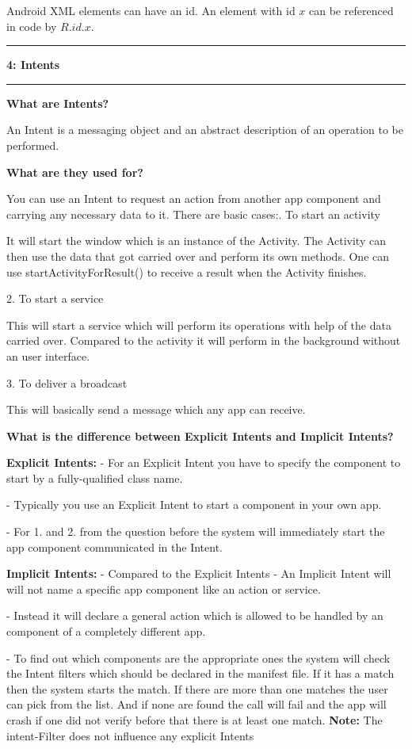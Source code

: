 \documentclass[11pt]{article}
\newcommand\question[2]{\vspace{.25in}\hrule\textbf{#1: #2}\vspace{.5em}\hrule\vspace{.10in}}
\begin{document}
Android XML elements can have an id. An element with id $x$ can be referenced in code by $R.id.x$.

\question{4}{Intents} 

\textbf {What are Intents?}

An Intent is a messaging object and an abstract description of an operation to be performed.

\textbf{What are they used for? }

You can use an Intent to request an action from another app component and carrying any necessary data to it.
There are basic cases:. To start an activity
	
It will start the window which is an instance of the Activity. 
The Activity can then use the data that got carried over and perform its own methods.
One can use startActivityForResult() to receive a result when the Activity finishes.
 
2. To start a service

This will start a service which will perform its operations with help of the data carried over.
Compared to the activity it will perform in the background without an user interface.

3. To deliver a broadcast

This will basically send a message which any app can receive.

\textbf {What is the difference between Explicit Intents and Implicit Intents?}

\textbf{Explicit Intents:}\newline
- For an Explicit Intent you have to specify the component to start by a fully-qualified class name.

- Typically you use an Explicit Intent to start a component in your own app.

- For 1. and 2. from the question before the system will immediately start the app component communicated in the Intent.

\textbf{Implicit Intents:}\newline
- Compared to the Explicit Intents - An Implicit Intent will will not name a specific app component like an action or service.

- Instead it will declare a general action which is allowed to be handled by an component of    a completely different app. 	

- To find out which components are the appropriate ones the system will check the Intent filters which should be declared in the manifest file.
If it has a match then the system starts the match. If there are more than one matches the user can pick from the list.
And if none are found the call will fail and the app will crash if one did not verify before that there is at least one match.\newline
\textbf{Note:} The intent-Filter does not influence any explicit Intents
\end{document}
